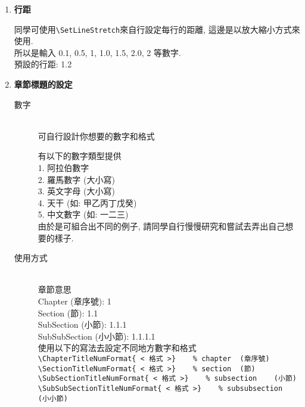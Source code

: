 \begin{enumerate}
  \item
  {
    \textbf{行距}

    同學可使用\verb|\SetLineStretch|來自行設定每行的距離, 這邊是以放大縮小方式來使用.\\
    所以是輸入 0.1, 0.5, 1, 1.0, 1.5, 2.0, 2 等數字.\\
    預設的行距: 1.2
  } %

  \item
  {
    \textbf{章節標題的設定}

    \begin{description}

    \item [數字]\hfill\\
        可自行設計你想要的數字和格式

        有以下的數字類型提供\\
            1. 阿拉伯數字\\
            2. 羅馬數字 (大小寫)\\
            3. 英文字母  (大小寫)\\
            4. 天干 (如: 甲乙丙丁戊癸)\\
            5. 中文數字 (如: 一二三)\\

        由於是可組合出不同的例子,  請同學自行慢慢研究和嘗試去弄出自己想要的樣子.

    \item [使用方式]\hfill\\
        章節意思\\
        Chapter (章序號): 1\\
        Section (節): 1.1\\
        SubSection (小節): 1.1.1\\
        SubSubSection (小小節): 1.1.1.1\\

        使用以下的寫法去設定不同地方數字和格式\\
            \verb|\ChapterTitleNumFormat{ < 格式 >}    % chapter 	(章序號)|\\
            \verb|\SectionTitleNumFormat{ < 格式 >}    % section 	(節)|\\
            \verb|\SubSectionTitleNumFormat{ < 格式 >}    % subsection 	(小節)|\\
            \verb|\SubSubSectionTitleNumFormat{ < 格式 >}    % subsubsection 	(小小節)|


\end{description}}
\end{enumerate}
